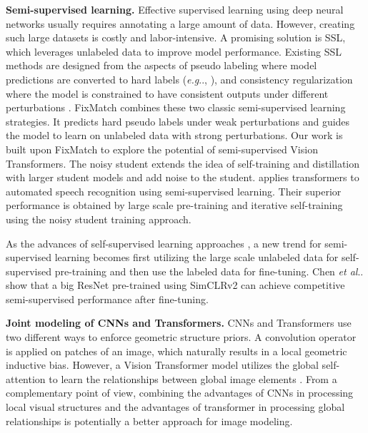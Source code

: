 \documentclass[runningheads]{llncs}
\makeatletter
\DeclareRobustCommand\onedot{\futurelet\@let@token\@onedot}
\def\@onedot{\ifx\@let@token.\else.\null\fi\xspace}
\def\eg{\emph{e.g}\onedot} \def\Eg{\emph{E.g}\onedot}
\def\etal{\emph{et al}\onedot}
\makeatother
\begin{document}
\textbf{Semi-supervised learning.} Effective supervised learning using deep neural networks usually requires annotating a large amount of data. However, creating such large datasets is costly and labor-intensive. A promising solution is SSL, which leverages unlabeled data to improve model performance. 
Existing SSL methods are designed from the aspects of pseudo labeling where model predictions are converted to hard labels (\eg, \cite{lee2013pseudo, rosenberg2005semi,yang2021deep}), and consistency regularization where the model is constrained to have consistent outputs under different perturbations \cite{bachman2014learning,rasmus2015semi, tarvainen2017mean,xie2020unsupervised, berthelot2019remixmatch}. FixMatch \cite{sohn2020fixmatch} combines these two classic semi-supervised learning strategies. It predicts hard pseudo labels under weak perturbations and guides the model to learn on unlabeled data with strong perturbations. Our work is built upon FixMatch to explore the potential of semi-supervised Vision Transformers. The noisy student \cite{Xie_2020_CVPR} extends the idea of self-training and distillation with larger student models and add noise to the student.  \cite{zhang2020pushing} applies transformers to automated speech recognition using semi-supervised learning. Their superior performance is obtained by large scale pre-training and iterative self-training using the noisy student training approach. 

As the advances of self-supervised learning approaches \cite{caron2021emerging,chen2020simple}, a new trend for semi-supervised learning becomes first utilizing the large scale unlabeled data for self-supervised pre-training and then use the labeled data for fine-tuning. Chen \etal \cite{chen2020big} show that a big ResNet pre-trained using SimCLRv2 can achieve competitive semi-supervised performance after fine-tuning.

\textbf{Joint modeling of CNNs and Transformers.}
CNNs and Transformers use two different ways to enforce geometric structure priors. A convolution operator is applied on patches of an image, which naturally results in a local geometric inductive bias. However, a Vision Transformer model utilizes the global self-attention to learn the relationships between global image elements \cite{dosovitskiy2020image}. 
From a complementary point of view, combining the advantages of CNNs in processing local visual structures and the advantages of transformer in processing global relationships is potentially a better approach for image modeling. 
\end{document}
